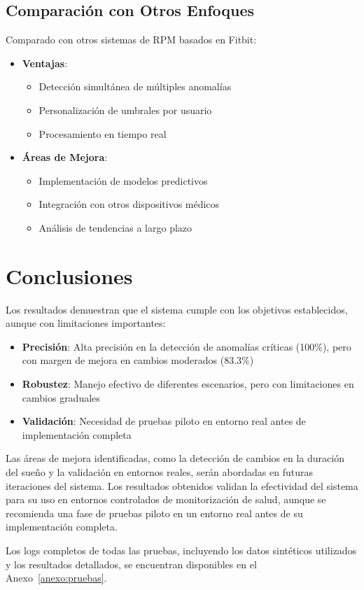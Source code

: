 \subsection{Comparación con Otros Enfoques}
Comparado con otros sistemas de RPM basados en Fitbit:
\begin{itemize}
    \item \textbf{Ventajas}:
    \begin{itemize}
        \item Detección simultánea de múltiples anomalías
        \item Personalización de umbrales por usuario
        \item Procesamiento en tiempo real
    \end{itemize}
    
    \item \textbf{Áreas de Mejora}:
    \begin{itemize}
        \item Implementación de modelos predictivos
        \item Integración con otros dispositivos médicos
        \item Análisis de tendencias a largo plazo
    \end{itemize}
\end{itemize}

\section{Conclusiones}
Los resultados demuestran que el sistema cumple con los objetivos establecidos, aunque con limitaciones importantes:

\begin{itemize}
    \item \textbf{Precisión}: Alta precisión en la detección de anomalías críticas (100\%), pero con margen de mejora en cambios moderados (83.3\%)
    \item \textbf{Robustez}: Manejo efectivo de diferentes escenarios, pero con limitaciones en cambios graduales
    \item \textbf{Validación}: Necesidad de pruebas piloto en entorno real antes de implementación completa
\end{itemize}

Las áreas de mejora identificadas, como la detección de cambios en la duración del sueño y la validación en entornos reales, serán abordadas en futuras iteraciones del sistema. Los resultados obtenidos validan la efectividad del sistema para su uso en entornos controlados de monitorización de salud, aunque se recomienda una fase de pruebas piloto en un entorno real antes de su implementación completa.

Los logs completos de todas las pruebas, incluyendo los datos sintéticos utilizados y los resultados detallados, se encuentran disponibles en el Anexo~\ref{anexo:pruebas}.